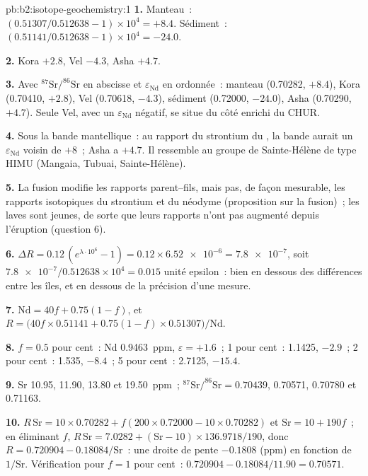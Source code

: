 \begin{solution}{pb:b2:isotope-geochemistry:1}
\textbf{1.} Manteau~: $(0.51307/0.512638 - 1)\times10^4 = +8.4$. Sédiment~:
$(0.51141/0.512638 - 1)\times10^4 = -24.0$.

\textbf{2.} Kora $+2.8$, Vel $-4.3$, Asha $+4.7$.

\textbf{3.} Avec $^{87}\mathrm{Sr}/^{86}\mathrm{Sr}$ en abscisse et $\varepsilon_{\mathrm{Nd}}$ en ordonnée~:
manteau (0.70282, $+8.4$), Kora (0.70410, $+2.8$), Vel (0.70618, $-4.3$), sédiment
(0.72000, $-24.0$), Asha (0.70290, $+4.7$). Seule Vel, avec un $\varepsilon_{\mathrm{Nd}}$ négatif,
se situe du côté enrichi du CHUR.

\textbf{4.} Sous la bande mantellique~: au rapport du strontium du , la bande
aurait un $\varepsilon_{\mathrm{Nd}}$ voisin de $+8$~; Asha a $+4.7$. Il ressemble au
groupe de Sainte-Hélène de type HIMU (Mangaia, Tubuai, Sainte-Hélène).

\textbf{5.} La fusion modifie les rapports parent--fils, mais pas, de façon mesurable, les
rapports isotopiques du strontium et du néodyme (proposition sur la fusion)~; les laves sont
jeunes, de sorte que leurs rapports n'ont pas augmenté depuis l'éruption (question 6).

\textbf{6.} $\Delta R = 0.12\,(e^{\lambda\cdot10^6} - 1) = 0.12\times\num{6.52e-6} =
\num{7.8e-7}$, soit $\num{7.8e-7}/0.512638\times10^4 = 0.015$ unité epsilon~: bien en dessous des
différences entre les îles, et en dessous de la précision d'une mesure.

\textbf{7.} $\mathrm{Nd} = 40f + 0.75(1-f)$, et
$R = \bigl(40f\times0.51141 + 0.75(1-f)\times0.51307\bigr)/\mathrm{Nd}$.

\textbf{8.} $f = 0.5$ pour cent~: Nd \qty{0.9463}{ppm}, $\varepsilon = +1.6$~; 1 pour cent~:
1.1425, $-2.9$~; 2 pour cent~: 1.535, $-8.4$~; 5 pour cent~: 2.7125, $-15.4$.

\textbf{9.} Sr 10.95, 11.90, 13.80 et \qty{19.50}{ppm}~; $^{87}\mathrm{Sr}/^{86}\mathrm{Sr} =
0.70439$, 0.70571, 0.70780 et 0.71163.

\textbf{10.} $R\,\mathrm{Sr} = 10\times0.70282 + f(200\times0.72000 - 10\times0.70282)$ et
$\mathrm{Sr} = 10 + 190f$~; en éliminant $f$, $R\,\mathrm{Sr} = 7.0282 +
(\mathrm{Sr}-10)\times136.9718/190$, donc $R = 0.720904 - 0.18084/\mathrm{Sr}$~: une droite
de pente $-0.1808$ (ppm) en fonction de $1/\mathrm{Sr}$. Vérification pour $f = 1$ pour cent~:
$0.720904 - 0.18084/11.90 = 0.70571$.


\end{solution}

